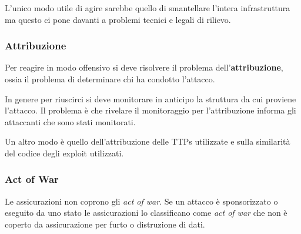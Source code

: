 L'unico modo utile di agire sarebbe quello di smantellare l'intera infrastruttura ma questo ci pone davanti a problemi
tecnici e legali di rilievo.

\subsubsection{Attribuzione}
Per reagire in modo offensivo si deve risolvere il problema dell'\textbf{attribuzione}, ossia il problema di
determinare chi ha condotto l'attacco.

In genere per riuscirci si deve monitorare in anticipo la struttura da cui proviene l'attacco. Il problema è che
rivelare il monitoraggio per l'attribuzione informa gli attaccanti che sono stati monitorati.

Un altro modo è quello dell'attribuzione delle TTPs utilizzate e sulla similarità del codice degli exploit utilizzati.

\subsubsection{Act of War}
Le assicurazioni non coprono gli \emph{act of war}. Se un attacco è sponsorizzato o eseguito da uno stato le
assicurazioni lo classificano come \emph{act of war} che non è coperto da assicurazione per furto o distruzione di
dati.